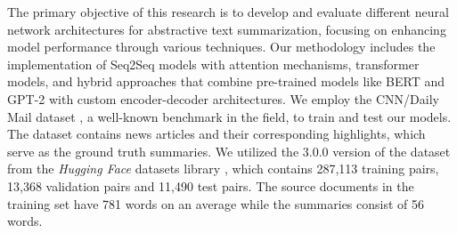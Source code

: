 The primary objective of this research is to develop and evaluate different neural network architectures for abstractive text summarization, focusing on enhancing model performance through various techniques. Our methodology includes the implementation of Seq2Seq models with attention mechanisms, transformer models, and hybrid approaches that combine pre-trained models like BERT and GPT-2 with custom encoder-decoder architectures. We employ the CNN/Daily Mail dataset \cite{see-etal-2017-get}, a well-known benchmark in the field, to train and test our models. The dataset contains news articles and their corresponding highlights, which serve as the ground truth summaries. We utilized the 3.0.0 version of the dataset from the \textit{Hugging Face} datasets library \cite{huggingface_cnn_dailymail}, which contains 287,113 training pairs, 13,368 validation pairs and 11,490 test pairs. The source documents in the training set have 781 words on an average while the summaries consist of 56 words.

